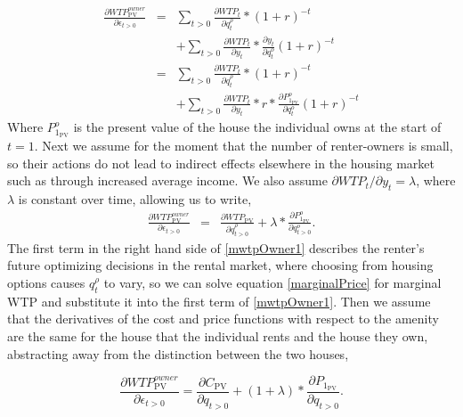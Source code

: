 \documentclass[ecta,nameyear,draft]{econsocart}
\theoremstyle{plain}
\theoremstyle{remark}
\begin{document}
\begin{eqnarray}
	\frac{\partial \mathit{WTP}^{\mathit{owner}}_{\mathrm{PV}}}{\partial \epsilon_{t>0}}&=&\sum_{t>0}\frac{\partial \mathit{WTP}_t}{\partial q^\rho_t}*(1+r)^{-t} \nonumber\\
	&& +\sum_{t>0}\frac{\partial \mathit{WTP}_t}{\partial y_t}*\frac{\partial y_t}{\partial q_t^o}(1+r)^{-t} \nonumber\\
	&=&\sum_{t>0}\frac{\partial \mathit{WTP}_t}{\partial q_t^\rho}*(1+r)^{-t}\nonumber\\
	&& +\sum_{t>0}\frac{\partial \mathit{WTP}_t}{\partial y_t}*r*\frac{\partial P^o_{1_\mathrm{PV}}}{\partial q_t^o}(1+r)^{-t} \label{mwtpOwner0}
\end{eqnarray}
Where $P^o_{1_\mathrm{PV}}$ is the present value of the house the individual owns at the start of $t=1$. Next we assume for the moment that the number of renter-owners is small, so their actions do not lead to indirect effects  elsewhere in the housing market such as through increased average income. We also assume $\partial \mathit{WTP}_t/\partial y_t=\lambda$, where $\lambda$ is constant over time, allowing us to write,
\begin{eqnarray}
	\frac{\partial \mathit{WTP}^{\mathit{owner}}_{\mathrm{PV}}}{\partial \epsilon_{t>0}} 
	&=&\frac{\partial \mathit{WTP_{\mathrm{PV}}}}{\partial q^\rho_{t>0}} + \lambda*\frac{\partial P^o_{1_\mathrm{PV}}}{\partial q_{t>0}^o} \label{mwtpOwner1}.
\end{eqnarray}
The first term in the right hand side of \ref{mwtpOwner1} describes the renter's future optimizing decisions in the rental market, where choosing from housing options causes $q_t^\rho$ to vary, so we can solve equation \ref{marginalPrice} for marginal WTP and substitute it into the first term of \ref{mwtpOwner1}. Then we assume that the derivatives of the cost and price functions with respect to the amenity are the same for the house that the individual rents and the house they own, abstracting away from the distinction between the two houses, 

\begin{equation}
	\frac{\partial \mathit{WTP}^{\mathit{owner}}_{\mathrm{PV}}}{\partial \epsilon_{t>0}} =	\frac{\partial C_{\mathrm{PV}}}{\partial q_{t>0}}+(1+\lambda)*\frac{\partial P_{1_\mathrm{PV}}}{\partial q_{t>0}}.
\end{equation}
\end{document}
